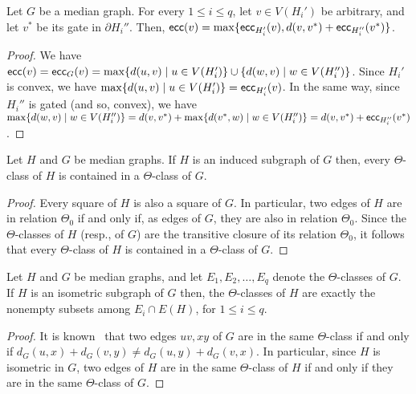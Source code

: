 \documentclass[a4paper,UKenglish,numberwithinsect,cleveref, autoref]{lipics-v2021}
\newcommand{\ecc}{\mbox{\textsf{ecc}}}
\begin{document}
\begin{lemma}\label{lem:guigui-1}
Let $G$ be a median graph.
For every $1 \leq i \leq q$, let $v \in V(H_i')$ be arbitrary, and let $v^*$ be its gate in $\partial H_i''$.
Then, $\ecc(v) = \max\{\ecc_{H_i'}(v), d(v,v^*) + \ecc_{H_i''}(v^*)\}$.
\end{lemma}
\begin{proof}
We have $\ecc(v) = \ecc_G(v) = \max\{d(u,v) \mid u \in V(H_i')\} \cup \{d(w,v) \mid w \in V(H_i'')\}$.
Since $H_i'$ is convex, we have $\max\{d(u,v) \mid u \in V(H_i')\} = \ecc_{H_i'}(v)$.
In the same way, since $H_i''$ is gated (and so, convex), we have $\max\{d(w,v) \mid w \in V(H_i'')\} = d(v,v^*) + \max\{d(v^*,w) \mid w \in V(H_i'')\} = d(v,v^*) + \ecc_{H_i''}(v^*)$.
\end{proof}

\begin{lemma}\label{lem:guigui-2}
Let $H$ and $G$ be median graphs.
If $H$ is an induced subgraph of $G$ then, every $\Theta$-class of $H$ is contained in a $\Theta$-class of $G$.
\end{lemma}
\begin{proof}
Every square of $H$ is also a square of $G$.
In particular, two edges of $H$ are in relation $\Theta_0$ if and only if, as edges of $G$, they are also in relation $\Theta_0$.
Since the $\Theta$-classes of $H$ (resp., of $G$) are the transitive closure of its relation $\Theta_0$, it follows that every $\Theta$-class of $H$ is contained in a $\Theta$-class of $G$.
\end{proof}

\begin{lemma}\label{lem:guigui-2bis}
Let $H$ and $G$ be median graphs, and let $E_1,E_2,\ldots,E_q$ denote the $\Theta$-classes of $G$.
If $H$ is an isometric subgraph of $G$ then, the $\Theta$-classes of $H$ are exactly the nonempty subsets among $E_i \cap E(H)$, for $1 \leq i \leq q$.
\end{lemma}
\begin{proof}
It is known~\cite{winkler1984isometric} that two edges $uv,xy$ of $G$ are in the same $\Theta$-class if and only if $d_G(u,x) + d_G(v,y) \neq d_G(u,y) + d_G(v,x)$.
In particular, since $H$ is isometric in $G$, two edges of $H$ are in the same $\Theta$-class of $H$ if and only if they are in the same $\Theta$-class of $G$.
\end{proof}
\end{document}
